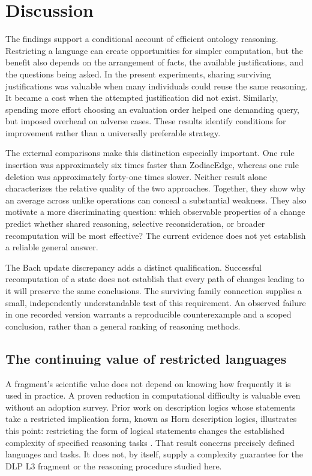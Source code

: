 \section{Discussion}
\label{sec:discussion}

The findings support a conditional account of efficient ontology reasoning.
Restricting a language can create opportunities for simpler computation, but
the benefit also depends on the arrangement of facts, the available
justifications, and the questions being asked. In the present experiments,
sharing surviving justifications was valuable when many individuals could
reuse the same reasoning. It became a cost when the attempted justification
did not exist. Similarly, spending more effort choosing an evaluation order
helped one demanding query, but imposed overhead on adverse cases. These
results identify conditions for improvement rather than a universally
preferable strategy.

The external comparisons make this distinction especially important. One
rule insertion was approximately six times faster than ZodiacEdge, whereas
one rule deletion was approximately forty-one times slower. Neither result
alone characterizes the relative quality of the two approaches. Together,
they show why an average across unlike operations can conceal a substantial
weakness. They also motivate a more discriminating question: which observable
properties of a change predict whether shared reasoning, selective
reconsideration, or broader recomputation will be most effective? The current
evidence does not yet establish a reliable general answer.

The Bach update discrepancy adds a distinct qualification. Successful
recomputation of a state does not establish that every path of changes leading
to it will preserve the same conclusions. The surviving family connection
supplies a small, independently understandable test of this requirement.
An observed failure in one recorded version warrants a reproducible
counterexample and a scoped conclusion, rather than a general ranking of
reasoning methods.

\subsection{The continuing value of restricted languages}

A fragment's scientific value does not depend on knowing how frequently it
is used in practice. A proven reduction in computational difficulty is
valuable even without an adoption survey. Prior work on description logics
whose statements take a restricted implication form, known as Horn description
logics, illustrates this point: restricting the form of logical statements
changes the established complexity of specified reasoning tasks
\cite{hustadt2005}. That result concerns precisely defined languages and
tasks. It does not, by itself, supply a complexity guarantee for the DLP L3
fragment or the reasoning procedure studied here.

